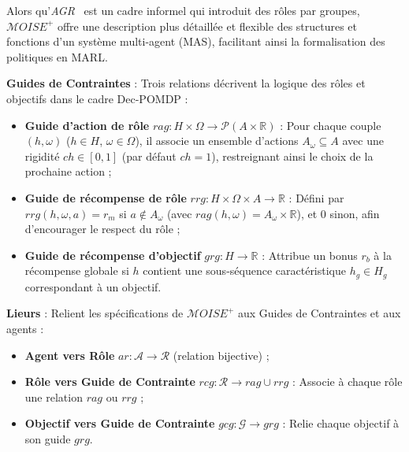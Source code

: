 \documentclass[francais,ROIA,Unicode,manuscript]{cedram}
\begin{document}
Alors qu'\textit{AGR}~\cite{ferber2003} est un cadre informel qui introduit des rôles par groupes, \(\mathcal{M}OISE^+\) offre une description plus détaillée et flexible des structures et fonctions d'un système multi-agent (MAS), facilitant ainsi la formalisation des politiques en MARL.

\medskip
\noindent \textbf{Guides de Contraintes} : Trois relations décrivent la logique des rôles et objectifs dans le cadre Dec-POMDP :

\begin{itemize}
    \item \textbf{Guide d'action de rôle} \(rag: H \times \Omega \to \mathcal{P}(A \times \mathbb{R})\) : Pour chaque couple \((h,\omega)\) (\(h\in H\), \(\omega\in \Omega\)), il associe un ensemble d'actions \(A_\omega \subseteq A\) avec une rigidité \(ch \in [0,1]\) (par défaut \(ch=1\)), restreignant ainsi le choix de la prochaine action ;
    \item \textbf{Guide de récompense de rôle} \(rrg: H \times \Omega \times A \to \mathbb{R}\) : Défini par \(rrg(h,\omega,a)=r_m\) si \(a \notin A_\omega\) (avec \(rag(h,\omega)=A_\omega \times \mathbb{R}\)), et 0 sinon, afin d'encourager le respect du rôle ;
    \item \textbf{Guide de récompense d'objectif} \(grg: H \to \mathbb{R}\) : Attribue un bonus \(r_b\) à la récompense globale si \(h\) contient une sous-séquence caractéristique \(h_g \in H_g\) correspondant à un objectif.
\end{itemize}


\medskip
\noindent \textbf{Lieurs} : Relient les spécifications de \(\mathcal{M}OISE^+\) aux Guides de Contraintes et aux agents :

\begin{itemize}
    \item \textbf{Agent vers Rôle} \(ar: \mathcal{A} \to \mathcal{R}\) (relation bijective) ;
    \item \textbf{Rôle vers Guide de Contrainte} \(rcg: \mathcal{R} \to rag \cup rrg\) : Associe à chaque rôle une relation \(rag\) ou \(rrg\) ;
    \item \textbf{Objectif vers Guide de Contrainte} \(gcg: \mathcal{G} \to grg\) : Relie chaque objectif à son guide \(grg\).
\end{itemize}
\end{document}
